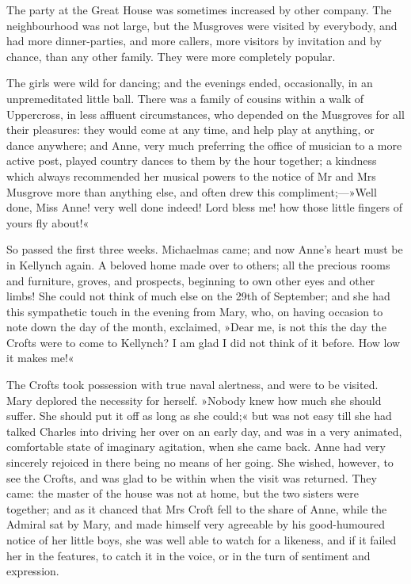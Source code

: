 The party at the Great House was sometimes increased by other company. The neighbourhood was not large, but the Musgroves were visited by everybody, and had more dinner-parties, and more callers, more visitors by invitation and by chance, than any other family. They were more completely popular.

The girls were wild for dancing; and the evenings ended, occasionally, in an unpremeditated little ball. There was a family of cousins within a walk of Uppercross, in less affluent circumstances, who depended on the Musgroves for all their pleasures: they would come at any time, and help play at anything, or dance anywhere; and Anne, very much preferring the office of musician to a more active post, played country dances to them by the hour together; a kindness which always recommended her musical powers to the notice of Mr and Mrs Musgrove more than anything else, and often drew this compliment;—»Well done, Miss Anne! very well done indeed! Lord bless me! how those little fingers of yours fly about!«

So passed the first three weeks. Michaelmas came; and now Anne's heart must be in Kellynch again. A beloved home made over to others; all the precious rooms and furniture, groves, and prospects, beginning to own other eyes and other limbs! She could not think of much else on the 29th of September; and she had this sympathetic touch in the evening from Mary, who, on having occasion to note down the day of the month, exclaimed, »Dear me, is not this the day the Crofts were to come to Kellynch? I am glad I did not think of it before. How low it makes me!«

The Crofts took possession with true naval alertness, and were to be visited. Mary deplored the necessity for herself. »Nobody knew how much she should suffer. She should put it off as long as she could;« but was not easy till she had talked Charles into driving her over on an early day, and was in a very animated, comfortable state of imaginary agitation, when she came back. Anne had very sincerely rejoiced in there being no means of her going. She wished, however, to see the Crofts, and was glad to be within when the visit was returned. They came: the master of the house was not at home, but the two sisters were together; and as it chanced that Mrs Croft fell to the share of Anne, while the Admiral sat by Mary, and made himself very agreeable by his good-humoured notice of her little boys, she was well able to watch for a likeness, and if it failed her in the features, to catch it in the voice, or in the turn of sentiment and expression.

